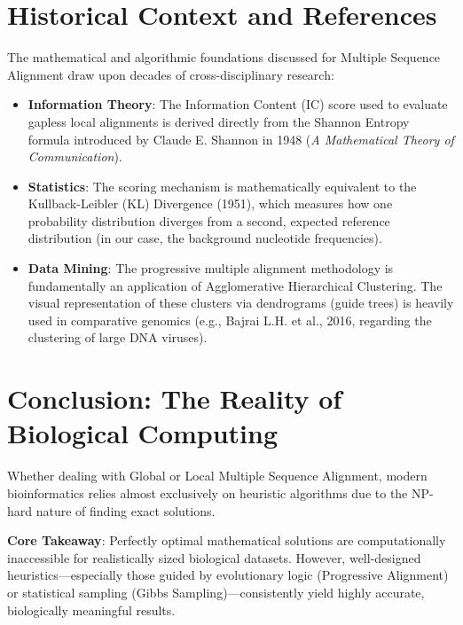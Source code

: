 \documentclass[11pt, a4paper]{article}
\newenvironment{important}
  {\begin{tcolorbox}[colback=blue!5!white, colframe=blue!75!black, arc=1mm, boxrule=1pt]}
  {\end{tcolorbox}}
\begin{document}
\section{Historical Context and References}

The mathematical and algorithmic foundations discussed for Multiple Sequence Alignment draw upon decades of cross-disciplinary research:

\begin{itemize}
    \item \textbf{Information Theory}: The Information Content (IC) score used to evaluate gapless local alignments is derived directly from the Shannon Entropy formula introduced by Claude E. Shannon in 1948 (\textit{A Mathematical Theory of Communication}).
    \item \textbf{Statistics}: The scoring mechanism is mathematically equivalent to the Kullback-Leibler (KL) Divergence (1951), which measures how one probability distribution diverges from a second, expected reference distribution (in our case, the background nucleotide frequencies).
    \item \textbf{Data Mining}: The progressive multiple alignment methodology is fundamentally an application of Agglomerative Hierarchical Clustering. The visual representation of these clusters via dendrograms (guide trees) is heavily used in comparative genomics (e.g., Bajrai L.H. et al., 2016, regarding the clustering of large DNA viruses).
\end{itemize}

\section{Conclusion: The Reality of Biological Computing}

Whether dealing with Global or Local Multiple Sequence Alignment, modern bioinformatics relies almost exclusively on heuristic algorithms due to the NP-hard nature of finding exact solutions. 

\begin{important}
  \textbf{Core Takeaway}: Perfectly optimal mathematical solutions are computationally inaccessible for realistically sized biological datasets. However, well-designed heuristics—especially those guided by evolutionary logic (Progressive Alignment) or statistical sampling (Gibbs Sampling)—consistently yield highly accurate, biologically meaningful results.
\end{important}
\end{document}
